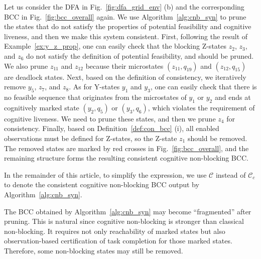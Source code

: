 \documentclass[journal,twoside,web]{ieeecolor}
\begin{document}
\begin{example}\label{ex:cnb_removal}
    Let us consider the DFA in Fig.~\ref{fig:dfa_grid_env} (b) and the corresponding BCC in Fig.~\ref{fig:bcc_overall} again.
    We use Algorithm~\ref{alg:cnb_syn} to prune the states that do not satisfy the properties of potential feasibility and cognitive liveness, and then we make this system consistent.
    First, following the result of Example~\ref{ex:y_z_prop}, one can easily check that the blocking Z-states $z_2$, $z_3$, and $z_6$ do not satisfy the definition of potential feasibility, and should be pruned.
    We also prune $z_{11}$ and $z_{12}$ because their microstates $(z_{11}, q_{19})$ and $(z_{12}, q_{15})$ are deadlock states.
    Next, based on the definition of consistency, we iteratively remove $y_5$, $z_7$, and $z_8$.
    As for Y-states $y_1$ and $y_3$, one can easily check that there is no feasible sequence that originates from the microstates of $y_1$ or $y_2$ and ends at cognitively marked state $(y_2, q_5)$ or $(y_3, q_6)$, which violates the requirement of cognitive liveness.
    We need to prune these states, and then we prune $z_4$ for consistency.
    Finally, based on Definition~\ref{def:con_bcc} (i), all enabled observations must be defined for Z-states, so the Z-state $z_1$ should be removed.
    The removed states are marked by red crosses in Fig.~\ref{fig:bcc_overall}, and the remaining structure forms the resulting consistent cognitive non-blocking BCC.
\end{example}


In the remainder of this article, to simplify the expression, we use $\mathcal{C}$ instead of $\mathcal{C}_c$ to denote the consistent cognitive non-blocking BCC output by Algorithm~\ref{alg:cnb_syn}.

\begin{remark}
The BCC obtained by Algorithm~\ref{alg:cnb_syn} may become ``fragmented'' after pruning. This is natural since cognitive non-blocking is stronger than classical non-blocking.
It requires not only reachability of marked states but also observation-based certification of task completion for those marked states.
Therefore, some non-blocking states may still be removed. 
\end{remark}
\end{document}
